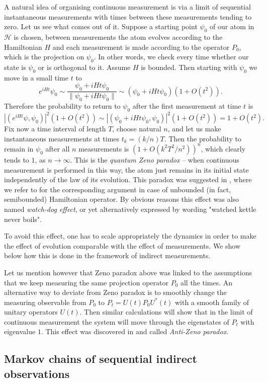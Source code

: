 \documentclass[12pt]{article}
\def\HC{\mathcal{H}}
\begin{document}
A natural idea of organising continuous measurement is via a limit of sequential instantaneous
measurements with times between these measurements tending to zero. Let us see what comes out of it.
Suppose a starting point $\psi_0$ of our atom in $\HC$ is chosen, between measurements
 the atom evolves according to the Hamiltonian $H$ and each measurement is made according
 to the operator $P_0$, which is the projection on $\psi_0$. In other words,
 we check every time whether our state is $\psi_0$ or is orthogonal to it.
 Assume $H$ is bounded. Then starting with $\psi_0$ we move in a small time $t$ to
 \[
 e^{iHt}\psi_0\sim \frac{\psi_0+iHt \psi_0}{\|\psi_0+iHt \psi_0\|}\sim (\psi_0+iHt \psi_0)(1+O(t^2)).
 \]
 Therefore the probability to return to $\psi_0$ after the first measurement at time $t$ is
 \[
 |(e^{iHt}\psi,\psi_0)|^2(1+O(t^2))\sim |(\psi_0+iHt \psi_0,\psi_0)|^2(1+O(t^2))=1+O(t^2).
 \]
 Fix now a time interval of length $T$, choose natural $n$,  and let us make instantaneous
 measurements at times $t_k=(k/n)T$. Then the probability to remain in $\psi_0$ after all $n$
 measurements is $(1+O(k^2T^2/n^2))^n$, which clearly tends to $1$, as $n\to \infty$.
 This is the {\it quantum Zeno paradox} -- when continuous measurement is performed in this way,
 the atom just remains in its initial state independently of the law of its evolution.
 This paradox was suggested in \cite{Zeno}, where we refer to for the corresponding
  argument in case of unbounded (in fact, semibounded) Hamiltonian operator.
 By obvious reasons this effect was also named {\it watch-dog effect}, or yet alternatively
 expressed by  wording "watched kettle never boils".

 To avoid this effect, one has to scale appropriately the dynamics in order to
 make the effect of evolution comparable with the effect of measurements.
 We show below how this is done in the framework of indirect measurements.

 Let us mention however that Zeno paradox above was linked to the assumptions that
 we keep measuring the same projection operator $P_0$ all the times. An alternative way to deviate
 from Zeno paradox is to smoothly change the measuring observable from $P_0$ to $P_t=U(t)P_0U^*(t)$
 with a smooth family of unitary operators $U(t)$. Then similar calculations will show that
 in the limit of continuous measurement the system will move through the eigenstates of $P_t$
 with eigenvalue $1$. This effect was discovered in \cite{Anti-Zeno} and called
 {\it Anti-Zeno paradox}.

\subsection{Markov chains of sequential indirect observations}
\label{secMarchainindirodserv}
\end{document}
